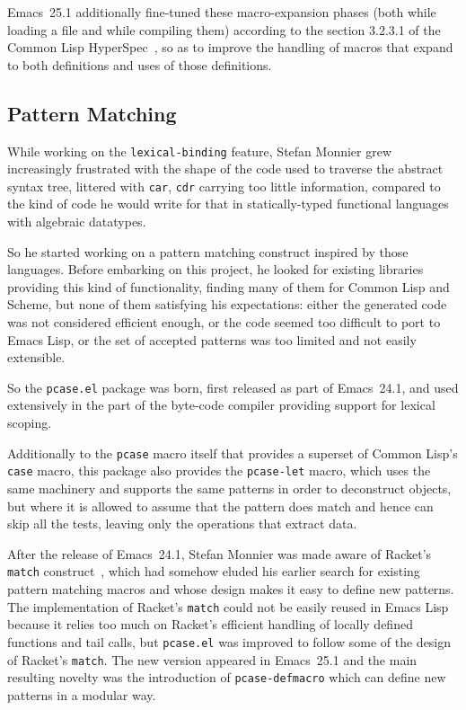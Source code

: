 \documentclass[format=acmsmall,screen]{acmart}
\newcommand \Elisp {Emacs Lisp}
\begin{document}
Emacs~25.1 additionally fine-tuned these macro-expansion phases (both
while loading a file and while compiling them) according to the section
3.2.3.1 of the Common Lisp HyperSpec~\cite{HyperSpec}, so as to improve the
handling of macros that expand to both definitions and uses of
those definitions.

\subsection{Pattern Matching}           %
\label{sec:pcase}

While working on the \texttt{lexical-binding} feature, Stefan Monnier grew
increasingly frustrated with the shape of the code used to traverse the
abstract syntax tree, littered with \texttt{car}, \texttt{cdr} carrying too
little information, compared to the kind of code he would write for that in
statically-typed functional languages with algebraic datatypes.

So he started working on a pattern matching construct inspired by those
languages.  Before embarking on this project, he looked for existing
libraries providing this kind of functionality, finding many of them for
Common Lisp and Scheme, but none of them satisfying his expectations: either
the generated code was not considered efficient enough, or the code seemed
too difficult to port to \Elisp{}, or the set of accepted patterns was too
limited and not easily extensible.

So the \texttt{pcase.el} package was born,
first released as part of Emacs~24.1, and used extensively in the part
of the byte-code compiler providing support for lexical scoping.

Additionally to the \texttt{pcase} macro itself that provides a superset of
Common Lisp's \texttt{case} macro, this package also provides the
\texttt{pcase-let} macro, which uses the same machinery and supports the same
patterns in order to deconstruct objects, but where it is allowed to assume
that the pattern does match and hence can skip all the tests, leaving only the
operations that extract data.

After the release of Emacs~24.1, Stefan Monnier was made aware of Racket's
\texttt{match} construct~\cite{RacketReference2018}, which had somehow eluded
his earlier search for
existing pattern matching macros and whose design makes it easy to define
new patterns.  The implementation of Racket's \texttt{match} could not be
easily reused in \Elisp{} because it relies too much on Racket's
efficient handling of locally defined functions and tail calls, but \texttt{pcase.el} was
improved to follow some of the design of Racket's \texttt{match}.
The new version appeared in Emacs~25.1 and the main resulting novelty was the
introduction of \texttt{pcase-defmacro} which can define new patterns
in a modular way. %
\end{document}
